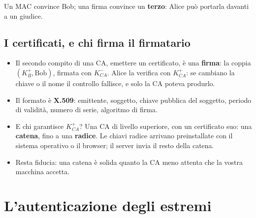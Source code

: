 Un MAC convince Bob; una firma convince un \textbf{terzo}: Alice può portarla davanti a un giudice.


\subsection{I certificati, e chi firma il firmatario}

\begin{itemize}
    \item Il secondo compito di una CA, emettere un certificato, è una \textbf{firma}: la coppia $(K_B^+, \text{Bob})$, firmata con
          $K_{CA}^-$. Alice la verifica con $K_{CA}^+$: se cambiano la chiave o il nome il controllo fallisce, e solo la CA poteva
          produrlo.
    \item Il formato è \textbf{X.509}: emittente, soggetto, chiave pubblica del soggetto, periodo di validità, numero di serie, algoritmo di
          firma.
    \item E chi garantisce $K_{CA}^+$? Una CA di livello superiore, con un certificato suo: una \textbf{catena}, fino a una
          \textbf{radice}. Le chiavi radice arrivano preinstallate con il sistema operativo o il browser; il server invia il resto della
          catena.
    \item Resta fiducia: una catena è solida quanto la CA meno attenta che la vostra macchina accetta.
\end{itemize}

\section{L'autenticazione degli estremi}


